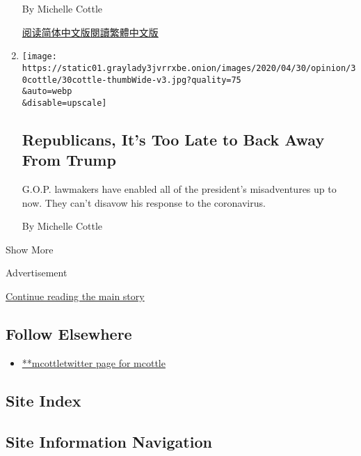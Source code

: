 \begin{enumerate}
  By Michelle Cottle

  \href{https://cn.nytimes3xbfgragh.onion/opinion/20200513/trump-pence-coronavirus-masks/}{阅读简体中文版}\href{https://cn.nytimes3xbfgragh.onion/opinion/20200513/trump-pence-coronavirus-masks/zh-hant/}{閱讀繁體中文版}
\item
  \href{/2020/04/30/opinion/coronavirus-trump-republicans.html}{}

  \texttt{[image: https://static01.graylady3jvrrxbe.onion/images/2020/04/30/opinion/30cottle/30cottle-thumbWide-v3.jpg?quality=75\\\&auto=webp\\\&disable=upscale]}

  \hypertarget{republicans-its-too-late-to-back-away-from-trump}{%
  \subsection{Republicans, It's Too Late to Back Away From
  Trump}\label{republicans-its-too-late-to-back-away-from-trump}}

  G.O.P. lawmakers have enabled all of the president's misadventures up
  to now. They can't disavow his response to the coronavirus.

  By Michelle Cottle
\end{enumerate}

Show More

Advertisement

\protect\hyperlink{after-mid2}{Continue reading the main story}

\hypertarget{follow-elsewhere}{%
\subsection{Follow Elsewhere}\label{follow-elsewhere}}

\begin{itemize}
\tightlist
\item
  \href{https://twitter.com/mcottle}{**mcottletwitter page for mcottle}
\end{itemize}

\hypertarget{site-index}{%
\subsection{Site Index}\label{site-index}}

\hypertarget{site-information-navigation}{%
\subsection{Site Information
Navigation}\label{site-information-navigation}}


